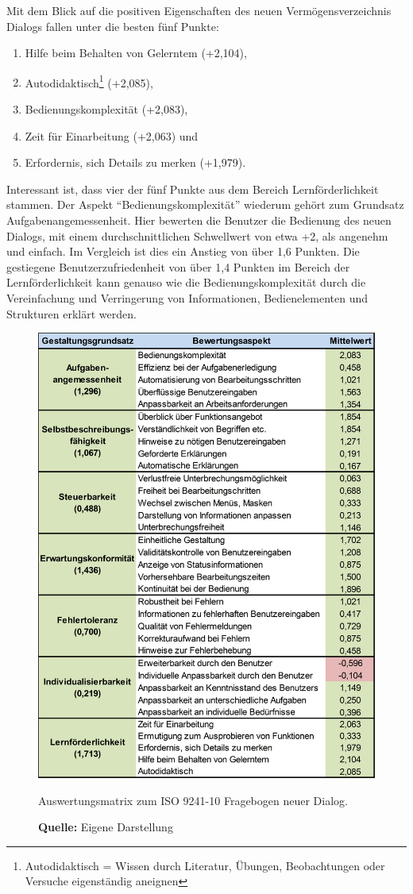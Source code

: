 Mit dem Blick auf die positiven Eigenschaften des neuen Vermögensverzeichnis Dialogs fallen unter die besten fünf Punkte:
\begin{enumerate}
    \item Hilfe beim Behalten von Gelerntem (+2,104),
    \item Autodidaktisch\footnote{Autodidaktisch = Wissen durch Literatur, Übungen, Beobachtungen oder Versuche eigenständig aneignen } (+2,085),
    \item Bedienungskomplexität (+2,083),
    \item Zeit für Einarbeitung (+2,063) und
    \item Erfordernis, sich Details zu merken (+1,979).
\end{enumerate}
Interessant ist, dass vier der fünf Punkte aus dem Bereich Lernförderlichkeit stammen. Der Aspekt \enquote{Bedienungskomplexität} wiederum gehört zum Grundsatz Aufgabenangemessenheit. Hier bewerten die Benutzer die Bedienung des neuen Dialogs, mit einem durchschnittlichen Schwellwert von etwa +2, als angenehm und einfach. Im Vergleich ist dies ein Anstieg von über 1,6 Punkten. Die gestiegene Benutzerzufriedenheit von über 1,4 Punkten im Bereich der Lernförderlichkeit kann genauso wie die Bedienungskomplexität durch die Vereinfachung und Verringerung von Informationen, Bedienelementen und Strukturen erklärt werden. 
\begin{figure}[H]
  \centering
  \includegraphics[width=430px]{img/Auswertungsmatrix_Neuer_Dialog.PNG}
  \caption{Auswertungsmatrix zum ISO 9241-10 Fragebogen neuer Dialog.}
  \caption*{\textbf{Quelle:} Eigene Darstellung}
  \label{fig:auswertungsmatrixNeuerDialog}
\end{figure}
